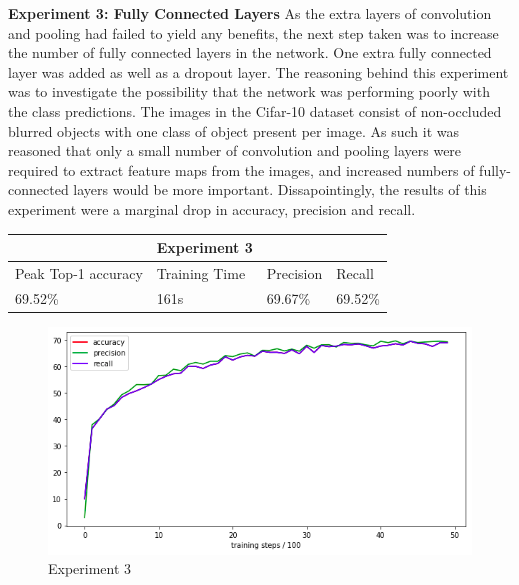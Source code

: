 \documentclass[12pt]{report}
\begin{document}
\begin{flushleft}
\vspace{0.5cm}
\textbf{Experiment 3: Fully Connected Layers}
\linebreak
As the extra layers of convolution and pooling had failed to yield any benefits, the next step taken was to increase the number of fully connected layers in the network. One extra fully connected layer was added as well as a dropout layer. The reasoning behind this experiment was to investigate the possibility that the network was performing poorly with the class predictions. The images in the Cifar-10 dataset consist of non-occluded blurred objects with one class of object present per image. As such it was reasoned that only a small number of convolution and pooling layers were required to extract feature maps from the images, and increased numbers of fully-connected layers would be more important. Dissapointingly, the results of this experiment were a marginal drop in accuracy, precision and recall.

\vspace{0.5cm}
\begin{tabular}{llll}
                                          & Experiment 3                       &                                &                              \\ \hline
\multicolumn{1}{|l|}{Peak Top-1 accuracy} & \multicolumn{1}{l|}{Training Time} & \multicolumn{1}{l|}{Precision} & \multicolumn{1}{l|}{Recall}  \\ \hline
\multicolumn{1}{|l|}{69.52\%}             & \multicolumn{1}{l|}{161s}          & \multicolumn{1}{l|}{69.67\%}   & \multicolumn{1}{l|}{69.52\%} \\ \hline
\end{tabular}

\vspace{0.5cm}
\begin{figure}[h]
	\centering
	\includegraphics[width=12cm]{experiment-3}
	\caption{Experiment 3}
	\label{fig:experiment-3}
\end{figure}
\end{flushleft}
\end{document}
